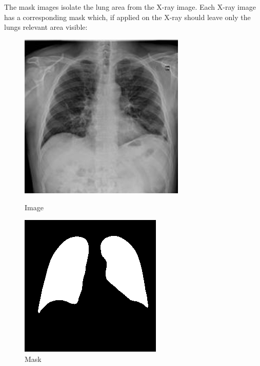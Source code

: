 \documentclass{article}
\begin{document}
The mask images isolate the lung area from the X-ray image. Each X-ray image has a corresponding mask which, if applied on the X-ray should leave only the lungs relevant area visible:
\begin{figure}[H]
    \centering
    \begin{minipage}[t]{0.48\textwidth}
        \centering
        \includegraphics[width=\linewidth]{COVID-101.png}
        \caption{Image}
        \label{fig:COVID-101.png}
    \end{minipage}
    \hfill
    \begin{minipage}[t]{0.48\textwidth}
        \centering
        \includegraphics[width=\linewidth]{COVIDmsk-101.png}
        \caption{Mask}
        \label{fig:COVIDmsk-101.png}
    \end{minipage}  
\end{figure}
\end{document}
